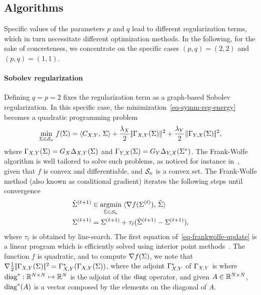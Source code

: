 \subsection{Algorithms} 
\label{secalgosymm}

Specific values of the parameters $p$ and $q$ lead to different regularization terms, which in turn necessitate different optimization methods. In the following, for the sake of concreteness, we concentrate on the specific cases $(p,q)=(2,2)$ and $(p,q)=(1,1)$.

\paragraph{Sobolev regularization}

Defining $q=p=2$ fixes the regularization term as a graph-based Sobolev regularization. In this specific case, the minimization~\eqref{eq-symm-reg-energy} becomes a quadratic programming problem 
\begin{equation} \label{eq-symm-S}
	\umin{\Sig \in \Matr_\kappa}
	f(\Sig) =  \dotp{ \Cost{X}{Y}}{\Sig } + \frac{\la_X}{2} \norm{ \Gamma_{X,Y}(\Sig)\|^2 + \frac{\la_Y}{2} \|\Gamma_{Y,X}(\Sig) }^2, 
\end{equation} 
where $\Gamma_{X,Y}(\Sigma) = G_X \Delta_{X,Y}(\Sigma)$ and $\Gamma_{Y,X}(\Sigma) = G_Y \Delta_{Y,X}(\Sigma^*)$. The Frank-Wolfe algorithm is well tailored to solve such problems, as noticed for instance in~\cite{Zaslavskiy09}, given that $f$ is convex and differentiable, and $\mathcal{S}_\kappa$ is a convex set. 
The Frank-Wolfe method (also known as conditional gradient) iterates the following steps until convergence
\begin{equation}
\begin{aligned}\label{eq-frankwolfe-update}
	\tilde\Sig^{(\ell+1)} &\in \uargmin{\tilde\Sig \in \Matr_\kappa} \dotp{\nabla f(\Sig^{(\ell)})}{ \tilde\Sig } \\
	\Sig^{(\ell+1)} &= \Sig^{(\ell+1)} + \tau_\ell ( \tilde\Sig^{(\ell+1)}-\Sig^{(\ell+1)} ),\\
\end{aligned}
\end{equation}
where $\tau_\ell$ is obtained by line-search. The first equation of~\eqref{eq-frankwolfe-update} is a linear program which is efficiently solved using interior point methods~\cite{Nesterov-Nemirovsky-Book}. 
The function $f$ is quadratic, and to compute $\nabla f(\Sigma)$, we note that $\nabla \frac{1}{2}|\!| \Gamma_{X,Y}(\Sigma) |\!|^2 = \Gamma_{X,Y}^*( \Gamma_{X,Y}(\Sigma) )$, where the adjoint $\Gamma_{X,Y}^*$ of $\Gamma_{X,Y}$ is
where $\diag^*: \RR^{N \times N} \mapsto \RR^{N}$ is the adjoint of the $\diag$ operator, and given $A \in \mathbb{R}^{N \times N}$, $\diag^*(A)$ is a vector composed by the elements on the diagonal of $A$. 

